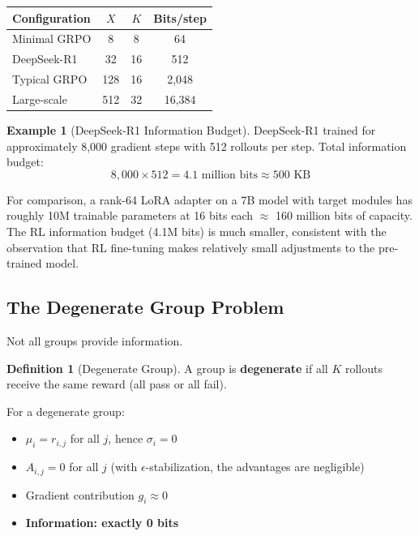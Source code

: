 \documentclass[11pt,a4paper]{article}
\theoremstyle{definition}
\newtheorem{definition}[theorem]{Definition}
\newtheorem{example}[theorem]{Example}
\theoremstyle{remark}
\begin{document}
\begin{center}
\begin{tabular}{@{}lccc@{}}
\toprule
\textbf{Configuration} & $X$ & $K$ & \textbf{Bits/step} \\
\midrule
Minimal GRPO & 8 & 8 & 64 \\
DeepSeek-R1 & 32 & 16 & 512 \\
Typical GRPO & 128 & 16 & 2,048 \\
Large-scale & 512 & 32 & 16,384 \\
\bottomrule
\end{tabular}
\end{center}

\begin{example}[DeepSeek-R1 Information Budget]
DeepSeek-R1 trained for approximately 8,000 gradient steps with 512 rollouts per step. Total information budget:
\[
8{,}000 \times 512 = 4.1 \text{ million bits} \approx 500 \text{ KB}
\]

For comparison, a rank-64 LoRA adapter on a 7B model with target modules has roughly 10M trainable parameters at 16 bits each $\approx$ 160 million bits of capacity. The RL information budget (4.1M bits) is much smaller, consistent with the observation that RL fine-tuning makes relatively small adjustments to the pre-trained model.
\end{example}

\subsection{The Degenerate Group Problem}

Not all groups provide information.

\begin{definition}[Degenerate Group]
A group is \textbf{degenerate} if all $K$ rollouts receive the same reward (all pass or all fail).
\end{definition}

For a degenerate group:
\begin{itemize}
    \item $\mu_i = r_{i,j}$ for all $j$, hence $\sigma_i = 0$
    \item $A_{i,j} = 0$ for all $j$ (with $\epsilon$-stabilization, the advantages are negligible)
    \item Gradient contribution $g_i \approx 0$
    \item \textbf{Information: exactly 0 bits}
\end{itemize}
\end{document}
